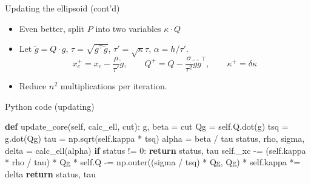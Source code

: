 \documentclass[10pt,ignorenonframetext,serif,onlymath]{beamer}
\newenvironment{Shaded}{}{}
\newcommand{\ControlFlowTok}[1]{\textcolor[rgb]{0.00,0.44,0.13}{\textbf{#1}}}
\newcommand{\DecValTok}[1]{\textcolor[rgb]{0.25,0.63,0.44}{#1}}
\newcommand{\KeywordTok}[1]{\textcolor[rgb]{0.00,0.44,0.13}{\textbf{#1}}}
\newcommand{\NormalTok}[1]{#1}
\newcommand{\OperatorTok}[1]{\textcolor[rgb]{0.40,0.40,0.40}{#1}}
\newcommand{\VariableTok}[1]{\textcolor[rgb]{0.10,0.09,0.49}{#1}}
\providecommand{\tightlist}{%
  \setlength{\itemsep}{0pt}\setlength{\parskip}{0pt}}
\begin{document}
\begin{frame}{Updating the ellipsoid (cont’d)}
\protect\hypertarget{sec:updating-the-ellipsoid-contd}{}

\begin{itemize}
\tightlist
\item
  Even better, split \(P\) into two variables \(\kappa \cdot Q\)
\item
  Let \(\tilde{g} = Q \cdot g\), \(\tau = \sqrt{g^\top\tilde{g}}\),
  \(\tau' = \sqrt{\kappa} \tau\), \(\alpha = h/\tau'\).
  \[x_c^+ = x_c - \frac{\rho}{\tau'} \tilde{g}, \qquad
  Q^+ = Q - \frac{\sigma}{\tau^2} \tilde{g}\tilde{g}^\top, \qquad
  \kappa^+ =  \delta \kappa
   \]
\item
  Reduce \(n^2\) multiplications per iteration.
\end{itemize}

\end{frame}

\begin{frame}[fragile]{Python code (updating)}
\protect\hypertarget{sec:python-code-updating}{}

\begin{Shaded}
\begin{Highlighting}[]
\KeywordTok{def}\NormalTok{ update_core(}\VariableTok{self}\NormalTok{, calc_ell, cut):}
\NormalTok{    g, beta }\OperatorTok{=}\NormalTok{ cut}
\NormalTok{    Qg }\OperatorTok{=} \VariableTok{self}\NormalTok{.Q.dot(g)}
\NormalTok{    tsq }\OperatorTok{=}\NormalTok{ g.dot(Qg)}
\NormalTok{    tau }\OperatorTok{=}\NormalTok{ np.sqrt(}\VariableTok{self}\NormalTok{.kappa }\OperatorTok{*}\NormalTok{ tsq)}
\NormalTok{    alpha }\OperatorTok{=}\NormalTok{ beta }\OperatorTok{/}\NormalTok{ tau}
\NormalTok{    status, rho, sigma, delta }\OperatorTok{=}\NormalTok{ calc_ell(alpha)}
    \ControlFlowTok{if}\NormalTok{ status }\OperatorTok{!=} \DecValTok{0}\NormalTok{:}
        \ControlFlowTok{return}\NormalTok{ status, tau}
    \VariableTok{self}\NormalTok{._xc }\OperatorTok{-=}\NormalTok{ (}\VariableTok{self}\NormalTok{.kappa }\OperatorTok{*}\NormalTok{ rho }\OperatorTok{/}\NormalTok{ tau) }\OperatorTok{*}\NormalTok{ Qg}
\OperatorTok{*}   \VariableTok{self}\NormalTok{.Q }\OperatorTok{-=}\NormalTok{ np.outer((sigma }\OperatorTok{/}\NormalTok{ tsq) }\OperatorTok{*}\NormalTok{ Qg, Qg)}
\OperatorTok{*}   \VariableTok{self}\NormalTok{.kappa }\OperatorTok{*=}\NormalTok{ delta}
    \ControlFlowTok{return}\NormalTok{ status, tau}
\end{Highlighting}
\end{Shaded}

\end{frame}
\end{document}
